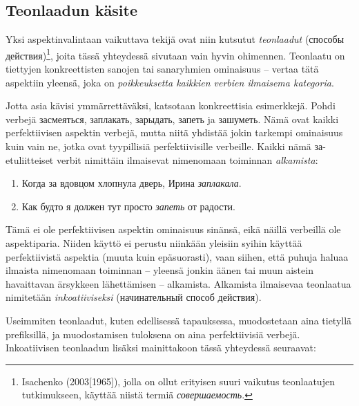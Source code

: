 \documentclass[]{scrartcl}
\providecommand{\tightlist}{%
  \setlength{\itemsep}{0pt}\setlength{\parskip}{0pt}}
\begin{document}
\subsection{Teonlaadun käsite}\label{teonlaadun-kuxe4site}

Yksi aspektinvalintaan vaikuttava tekijä ovat niin kutsutut
\emph{teonlaadut} (способы действия)\footnote{Isachenko
  (2003{[}1965{]}), jolla on ollut erityisen suuri vaikutus teonlaatujen
  tutkimukseen, käyttää niistä termiä \emph{совершаемость}.}, joita
tässä yhteydessä sivutaan vain hyvin ohimennen. Teonlaatu on tiettyjen
konkreettisten sanojen tai sanaryhmien ominaisuus -- vertaa tätä
aspektiin yleensä, joka on \emph{poikkeuksetta kaikkien verbien
ilmaisema kategoria}.

Jotta asia kävisi ymmärrettäväksi, katsotaan konkreettisia esimerkkejä.
Pohdi verbejä засмеяться, заплакать, зарыдать, запеть ja зашуметь. Nämä
ovat kaikki perfektiivisen aspektin verbejä, mutta niitä yhdistää jokin
tarkempi ominaisuus kuin vain ne, jotka ovat tyypillisiä
perfektiivisille verbeille. Kaikki nämä за-etuliitteiset verbit
nimittäin ilmaisevat nimenomaan toiminnan \emph{alkamista}:

\begin{enumerate}
\def\labelenumi{(\arabic{enumi})}
\setcounter{enumi}{347}
\tightlist
\item
  Когда за вдовцом хлопнула дверь, Ирина \emph{заплакала}.
\item
  Как будто я должен тут просто \emph{запеть} от радости.
\end{enumerate}

Tämä ei ole perfektiivisen aspektin ominaisuus sinänsä, eikä näillä
verbeillä ole aspektiparia. Niiden käyttö ei perustu niinkään yleisiin
syihin käyttää perfektiivistä aspektia (muuta kuin epäsuorasti), vaan
siihen, että puhuja haluaa ilmaista nimenomaan toiminnan -- yleensä
jonkin äänen tai muun aistein havaittavan ärsykkeen lähettämisen --
alkamista. Alkamista ilmaisevaa teonlaatua nimitetään
\emph{inkoatiiviseksi} (начинательный способ действия).

Useimmiten teonlaadut, kuten edellisessä tapauksessa, muodostetaan aina
tietyllä prefiksillä, ja muodostamisen tuloksena on aina perfektiivisiä
verbejä. Inkoatiivisen teonlaadun lisäksi mainittakoon tässä yhteydessä
seuraavat:
\end{document}
